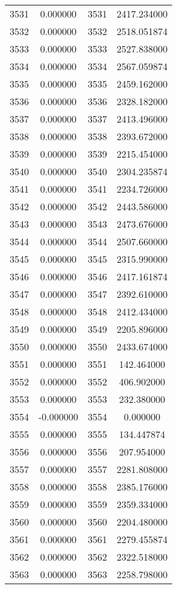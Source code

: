 \documentclass[12pt]{article}
\begin{document}
\begin{longtable}{@{}cccc@{}}
3531 & 0.000000 & 3531 & 2417.234000 \\
3532 & 0.000000 & 3532 & 2518.051874 \\
3533 & 0.000000 & 3533 & 2527.838000 \\
3534 & 0.000000 & 3534 & 2567.059874 \\
3535 & 0.000000 & 3535 & 2459.162000 \\
3536 & 0.000000 & 3536 & 2328.182000 \\
3537 & 0.000000 & 3537 & 2413.496000 \\
3538 & 0.000000 & 3538 & 2393.672000 \\
3539 & 0.000000 & 3539 & 2215.454000 \\
3540 & 0.000000 & 3540 & 2304.235874 \\
3541 & 0.000000 & 3541 & 2234.726000 \\
3542 & 0.000000 & 3542 & 2443.586000 \\
3543 & 0.000000 & 3543 & 2473.676000 \\
3544 & 0.000000 & 3544 & 2507.660000 \\
3545 & 0.000000 & 3545 & 2315.990000 \\
3546 & 0.000000 & 3546 & 2417.161874 \\
3547 & 0.000000 & 3547 & 2392.610000 \\
3548 & 0.000000 & 3548 & 2412.434000 \\
3549 & 0.000000 & 3549 & 2205.896000 \\
3550 & 0.000000 & 3550 & 2433.674000 \\
3551 & 0.000000 & 3551 & 142.464000 \\
3552 & 0.000000 & 3552 & 406.902000 \\
3553 & 0.000000 & 3553 & 232.380000 \\
3554 & -0.000000 & 3554 & 0.000000 \\
3555 & 0.000000 & 3555 & 134.447874 \\
3556 & 0.000000 & 3556 & 207.954000 \\
3557 & 0.000000 & 3557 & 2281.808000 \\
3558 & 0.000000 & 3558 & 2385.176000 \\
3559 & 0.000000 & 3559 & 2359.334000 \\
3560 & 0.000000 & 3560 & 2204.480000 \\
3561 & 0.000000 & 3561 & 2279.455874 \\
3562 & 0.000000 & 3562 & 2322.518000 \\
3563 & 0.000000 & 3563 & 2258.798000 \\

\end{longtable}
\end{document}
